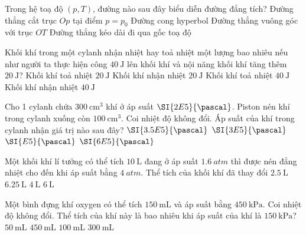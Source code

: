\begin{ex}
	Trong hệ toạ độ $\left(p, T\right)$, đường nào sau đây biểu diễn đường đẳng tích?
	\choice
	{Đường thẳng cắt trục $Op$ tại điểm $p=p_0$}
	{Đường cong hyperbol}
	{Đường thẳng vuông góc với trục $OT$}
	{\True Đường thẳng kéo dài đi qua gốc toạ độ}
	\loigiai{}
\end{ex}
\begin{ex}
	Khối khí trong một cylanh nhận nhiệt hay toả nhiệt một lượng bao nhiêu nếu như người ta thực hiện công $\SI{40}{\joule}$ lên khối khí và nội năng khối khí tăng thêm $\SI{20}{\joule}$?
	\choice
	{\True Khối khí toả nhiệt $\SI{20}{\joule}$}
	{Khối khí nhận nhiệt $\SI{20}{\joule}$}
	{Khối khí toả nhiệt $\SI{40}{\joule}$}
	{Khối khí nhận nhiệt $\SI{40}{\joule}$}
\end{ex}
\begin{ex}
Cho 1 cylanh chứa $\SI{300}{\centi\meter^3}$ khí ở áp suất $\SI{2E5}{\pascal}$. Piston nén khí trong cylanh xuống còn $\SI{100}{\centi\meter^3}$. Coi nhiệt độ không đổi. Áp suất của khí trong cylanh nhận giá trị nào sau đây?	
	\choice
	{$\SI{3.5E5}{\pascal}$}
	{$\SI{3E5}{\pascal}$}
	{$\SI{E5}{\pascal}$}
	{\True $\SI{6E5}{\pascal}$}
\end{ex}
\begin{ex}
	Một khối khí lí tưởng có thể tích $\SI{10}{\liter}$ đang ở áp suất $\SI{1.6}{atm}$ thì được nén đẳng nhiệt cho đến khi áp suất bằng $\SI{4}{atm}$. Thể tích của khối khí đã thay đổi
	\choice
	{$\SI{2.5}{\liter}$}
	{$\SI{6.25}{\liter}$}
	{\True $\SI{4}{\liter}$}
	{$\SI{6}{\liter}$}
\end{ex}
\begin{ex}
Một bình đựng khí oxygen có thể tích $\SI{150}{\milli\liter}$ và áp suất bằng $\SI{450}{\kilo\pascal}$. Coi nhiệt độ không đổi. Thể tích của khí này là bao nhiêu khi áp suất của khí là $\SI{150}{\kilo\pascal}$?
	\choice
	{$\SI{50}{\milli\liter}$}
	{\True $\SI{450}{\milli\liter}$}
	{$\SI{100}{\milli\liter}$}
	{$\SI{300}{\milli\liter}$}
\end{ex}
